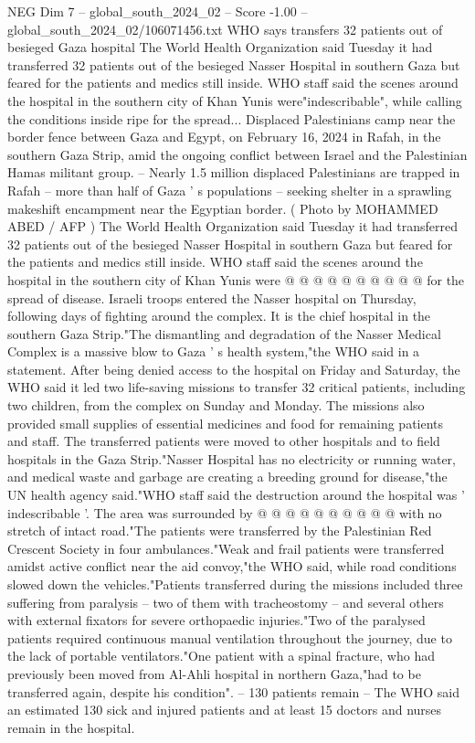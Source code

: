\begin{textsample}{NEG Dim 7 – global\_south\_2024\_02 – Score -1.00 – global\_south\_2024\_02/106071456.txt}  \label{ex:f7_neg_251}
WHO says transfers 32 patients out of besieged Gaza hospital The World Health Organization said Tuesday it had transferred 32 patients out of the besieged Nasser Hospital in southern Gaza but feared for the patients and medics still inside.
WHO staff said the scenes around the hospital in the southern city of Khan Yunis were"indescribable", while calling the conditions inside ripe for the spread...
Displaced Palestinians camp near the border fence between Gaza and Egypt, on February 16, 2024 in Rafah, in the southern Gaza Strip, amid the ongoing conflict between Israel and the Palestinian Hamas militant group. -- Nearly 1.5 million displaced Palestinians are trapped in Rafah -- more than half of Gaza ' s populations -- seeking shelter in a sprawling makeshift encampment near the Egyptian border. ( Photo by MOHAMMED ABED / AFP ) The World Health Organization said Tuesday it had transferred 32 patients out of the besieged Nasser Hospital in southern Gaza but feared for the patients and medics still inside.
WHO staff said the scenes around the hospital in the southern city of Khan Yunis were @ @ @ @ @ @ @ @ @ @ for the spread of disease.
Israeli troops entered the Nasser hospital on Thursday, following days of fighting around the complex.
It is the chief hospital in the southern Gaza Strip."The dismantling and degradation of the Nasser Medical Complex is a massive blow to Gaza ' s health system,"the WHO said in a statement.
After being denied access to the hospital on Friday and Saturday, the WHO said it led two life-saving missions to transfer 32 critical patients, including two children, from the complex on Sunday and Monday.
The missions also provided small supplies of essential medicines and food for remaining patients and staff.
The transferred patients were moved to other hospitals and to field hospitals in the Gaza Strip."Nasser Hospital has no electricity or running water, and medical waste and garbage are creating a breeding ground for disease,"the UN health agency said."WHO staff said the destruction around the hospital was ' indescribable '.
The area was surrounded by @ @ @ @ @ @ @ @ @ @ with no stretch of intact road."The patients were transferred by the Palestinian Red Crescent Society in four ambulances."Weak and frail patients were transferred amidst active conflict near the aid convoy,"the WHO said, while road conditions slowed down the vehicles."Patients transferred during the missions included three suffering from paralysis -- two of them with tracheostomy -- and several others with external fixators for severe orthopaedic injuries."Two of the paralysed patients required continuous manual ventilation throughout the journey, due to the lack of portable ventilators."One patient with a spinal fracture, who had previously been moved from Al-Ahli hospital in northern Gaza,"had to be transferred again, despite his condition". -- 130 patients remain -- The WHO said an estimated 130 sick and injured patients and at least 15 doctors and nurses remain in the hospital.

\end{textsample}
